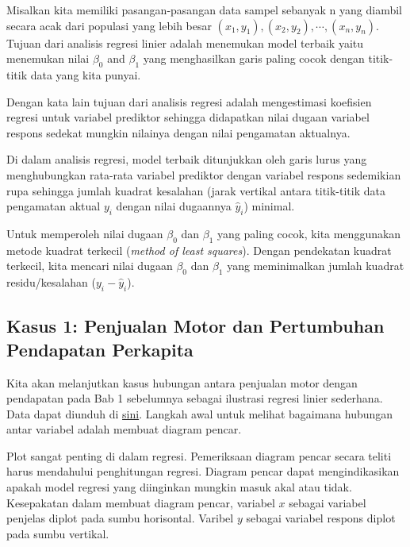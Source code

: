 \documentclass[
]{book}
\begin{document}
Misalkan kita memiliki pasangan-pasangan data sampel sebanyak n yang diambil secara acak dari populasi yang lebih besar \((x_1,y_1), (x_2,y_2), ⋯, (x_n,y_n)\). Tujuan dari analisis regresi linier adalah menemukan model terbaik yaitu menemukan nilai \(\beta_0\) and \(\beta_1\) yang menghasilkan garis paling cocok dengan titik-titik data yang kita punyai.

Dengan kata lain tujuan dari analisis regresi adalah mengestimasi koefisien regresi untuk variabel prediktor sehingga didapatkan nilai dugaan variabel respons sedekat mungkin nilainya dengan nilai pengamatan aktualnya.

Di dalam analisis regresi, model terbaik ditunjukkan oleh garis lurus yang menghubungkan rata-rata variabel prediktor dengan variabel respons sedemikian rupa sehingga jumlah kuadrat kesalahan (jarak vertikal antara titik-titik data pengamatan aktual \(y_i\) dengan nilai dugaannya \(\hat y_i\)) minimal.

Untuk memperoleh nilai dugaan \(\beta_0\) dan \(\beta_1\) yang paling cocok, kita menggunakan metode kuadrat terkecil (\emph{method of least squares}). Dengan pendekatan kuadrat terkecil, kita mencari nilai dugaan \(\beta_0\) dan \(\beta_1\) yang meminimalkan jumlah kuadrat residu/kesalahan (\(y_i-\hat y_i\)).

\hypertarget{kasus-1-penjualan-motor-dan-pertumbuhan-pendapatan-perkapita}{%
\subsection{Kasus 1: Penjualan Motor dan Pertumbuhan Pendapatan Perkapita}\label{kasus-1-penjualan-motor-dan-pertumbuhan-pendapatan-perkapita}}

Kita akan melanjutkan kasus hubungan antara penjualan motor dengan pendapatan pada Bab 1 sebelumnya sebagai ilustrasi regresi linier sederhana. Data dapat diunduh di \href{https://drive.google.com/file/d/1Aa6A0KkXXINoDkdNJSnYUY5Y0E1xnrOb/view?usp=sharing}{sini}. Langkah awal untuk melihat bagaimana hubungan antar variabel adalah membuat diagram pencar.

Plot sangat penting di dalam regresi. Pemeriksaan diagram pencar secara teliti harus mendahului penghitungan regresi. Diagram pencar dapat mengindikasikan apakah model regresi yang diinginkan mungkin masuk akal atau tidak. Kesepakatan dalam membuat diagram pencar, variabel \(x\) sebagai variabel penjelas diplot pada sumbu horisontal. Varibel \(y\) sebagai variabel respons diplot pada sumbu vertikal.
\end{document}
